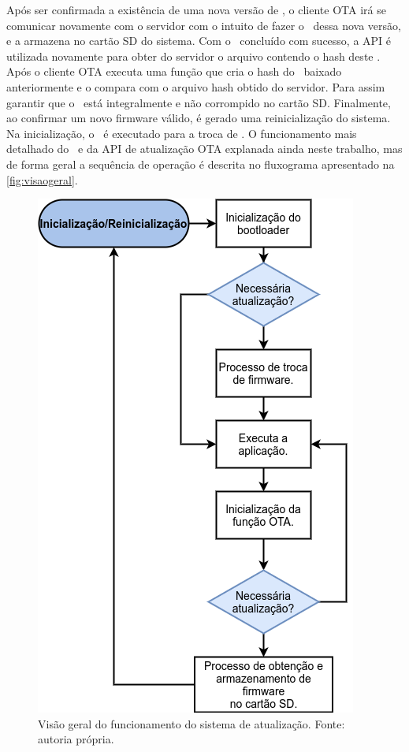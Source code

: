 Após ser confirmada a existência de uma nova versão de \firmware, o cliente OTA irá se comunicar novamente com o servidor com o intuito de fazer o \download\ dessa nova versão, e a armazena no cartão SD do sistema. Com o \download\ concluído com sucesso, a API é utilizada novamente para obter do servidor o arquivo contendo o hash deste \firmware. Após o cliente OTA executa uma função que cria o hash do \firmware\ baixado anteriormente e o compara com o arquivo hash obtido do servidor. Para assim garantir que o \firmware\ está integralmente e não corrompido no cartão SD. Finalmente, ao confirmar um novo firmware válido, é gerado uma reinicialização do sistema. Na inicialização, o \bootloader\ é executado para a troca de \firmware. O funcionamento mais detalhado do \bootloader\ e da API de atualização OTA explanada ainda neste trabalho, mas de forma geral a sequência de operação é descrita no fluxograma apresentado na \autoref{fig:visaogeral}.



\begin{figure}[H]
    \scriptsize
     \centering
     \includegraphics[scale=0.7]{dados/figuras/FuncionamentoGeral.png}
     \caption{Visão geral do funcionamento do sistema de atualização. \newline Fonte: autoria própria.}
     \label{fig:visaogeral}
\end{figure}

